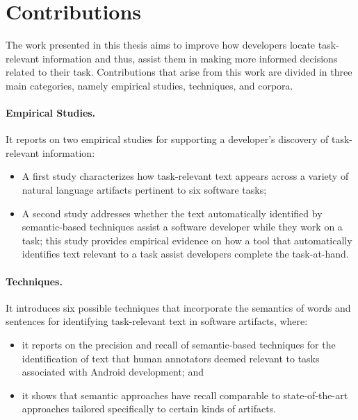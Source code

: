 

\section{Contributions}
\label{cp1:contributions}


The work presented in this thesis 
aims to improve how developers locate task-relevant information and thus, assist them in making more informed decisions related to their task.
Contributions that arise from this work are divided in three main categories, namely 
empirical studies, techniques, and corpora.




\paragraph{\textbf{Empirical Studies.}} 

It reports on two empirical studies for supporting a developer's discovery of task-relevant information:

\begin{itemize}

    \item A first study characterizes how task-relevant text appears across a variety of natural language artifacts pertinent to six software tasks; 

    \item A second study addresses whether 
    the text automatically identified by semantic-based techniques assist a software developer while they work on a task; this study provides empirical evidence on how a tool that automatically identifies 
    text relevant to a task assist developers complete the task-at-hand.
\end{itemize}




\paragraph{\textbf{Techniques.}} 

It introduces six possible techniques that incorporate the semantics of words and sentences for identifying task-relevant text in software artifacts, where:
    
\begin{itemize}
    
    \item it reports on the precision and recall of semantic-based techniques for the identification of text that human annotators deemed relevant to tasks associated with Android development; and
    \item it shows that semantic approaches have recall comparable to state-of-the-art approaches
    tailored specifically to certain kinds of artifacts.
\end{itemize}

